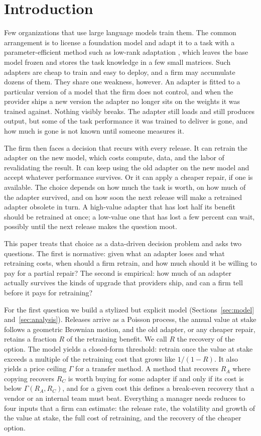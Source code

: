 \documentclass[preprint,12pt,authoryear]{elsarticle}
\begin{document}
\section{Introduction}\label{sec:intro}

Few organizations that use large language models train them. The common arrangement is to license a foundation model and adapt it to a task with a parameter-efficient method such as low-rank adaptation \citep[LoRA;][]{hu2022lora}, which leaves the base model frozen and stores the task knowledge in a few small matrices. Such adapters are cheap to train and easy to deploy, and a firm may accumulate dozens of them. They share one weakness, however. An adapter is fitted to a particular version of a model that the firm does not control, and when the provider ships a new version the adapter no longer sits on the weights it was trained against. Nothing visibly breaks. The adapter still loads and still produces output, but some of the task performance it was trained to deliver is gone, and how much is gone is not known until someone measures it.

The firm then faces a decision that recurs with every release. It can retrain the adapter on the new model, which costs compute, data, and the labor of revalidating the result. It can keep using the old adapter on the new model and accept whatever performance survives. Or it can apply a cheaper repair, if one is available. The choice depends on how much the task is worth, on how much of the adapter survived, and on how soon the next release will make a retrained adapter obsolete in turn. A high-value adapter that has lost half its benefit should be retrained at once; a low-value one that has lost a few percent can wait, possibly until the next release makes the question moot.

This paper treats that choice as a data-driven decision problem and asks two questions. The first is normative: given what an adapter loses and what retraining costs, when should a firm retrain, and how much should it be willing to pay for a partial repair? The second is empirical: how much of an adapter actually survives the kinds of upgrade that providers ship, and can a firm tell before it pays for retraining?

For the first question we build a stylized but explicit model (Sections~\ref{sec:model} and~\ref{sec:analysis}). Releases arrive as a Poisson process, the annual value at stake follows a geometric Brownian motion, and the old adapter, or any cheaper repair, retains a fraction $R$ of the retraining benefit. We call $R$ the recovery of the option. The model yields a closed-form threshold: retrain once the value at stake exceeds a multiple of the retraining cost that grows like $1/(1-R)$. It also yields a price ceiling $\Gamma$ for a transfer method. A method that recovers $R_A$ where copying recovers $R_C$ is worth buying for some adapter if and only if its cost is below $\Gamma(R_A,R_C)$, and for a given cost this defines a break-even recovery that a vendor or an internal team must beat. Everything a manager needs reduces to four inputs that a firm can estimate: the release rate, the volatility and growth of the value at stake, the full cost of retraining, and the recovery of the cheaper option.
\end{document}
